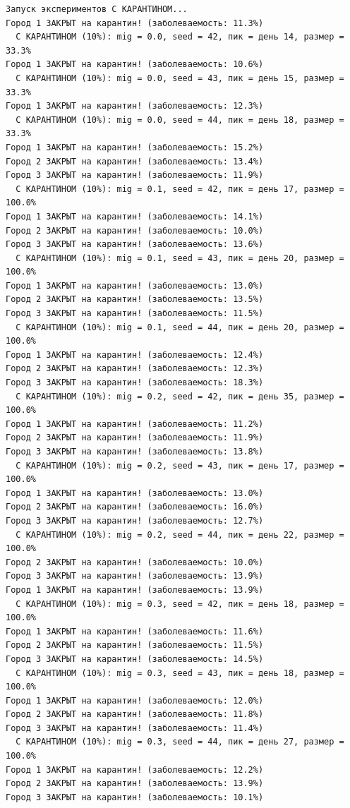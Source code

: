 \documentclass[
  12pt,
  a4paper,
  DIV=11,
  numbers=noendperiod]{scrreprt}
\begin{document}
\begin{verbatim}
Запуск экспериментов С КАРАНТИНОМ...
Город 1 ЗАКРЫТ на карантин! (заболеваемость: 11.3%)
  С КАРАНТИНОМ (10%): mig = 0.0, seed = 42, пик = день 14, размер = 33.3%
Город 1 ЗАКРЫТ на карантин! (заболеваемость: 10.6%)
  С КАРАНТИНОМ (10%): mig = 0.0, seed = 43, пик = день 15, размер = 33.3%
Город 1 ЗАКРЫТ на карантин! (заболеваемость: 12.3%)
  С КАРАНТИНОМ (10%): mig = 0.0, seed = 44, пик = день 18, размер = 33.3%
Город 1 ЗАКРЫТ на карантин! (заболеваемость: 15.2%)
Город 2 ЗАКРЫТ на карантин! (заболеваемость: 13.4%)
Город 3 ЗАКРЫТ на карантин! (заболеваемость: 11.9%)
  С КАРАНТИНОМ (10%): mig = 0.1, seed = 42, пик = день 17, размер = 100.0%
Город 1 ЗАКРЫТ на карантин! (заболеваемость: 14.1%)
Город 2 ЗАКРЫТ на карантин! (заболеваемость: 10.0%)
Город 3 ЗАКРЫТ на карантин! (заболеваемость: 13.6%)
  С КАРАНТИНОМ (10%): mig = 0.1, seed = 43, пик = день 20, размер = 100.0%
Город 1 ЗАКРЫТ на карантин! (заболеваемость: 13.0%)
Город 2 ЗАКРЫТ на карантин! (заболеваемость: 13.5%)
Город 3 ЗАКРЫТ на карантин! (заболеваемость: 11.5%)
  С КАРАНТИНОМ (10%): mig = 0.1, seed = 44, пик = день 20, размер = 100.0%
Город 1 ЗАКРЫТ на карантин! (заболеваемость: 12.4%)
Город 2 ЗАКРЫТ на карантин! (заболеваемость: 12.3%)
Город 3 ЗАКРЫТ на карантин! (заболеваемость: 18.3%)
  С КАРАНТИНОМ (10%): mig = 0.2, seed = 42, пик = день 35, размер = 100.0%
Город 1 ЗАКРЫТ на карантин! (заболеваемость: 11.2%)
Город 2 ЗАКРЫТ на карантин! (заболеваемость: 11.9%)
Город 3 ЗАКРЫТ на карантин! (заболеваемость: 13.8%)
  С КАРАНТИНОМ (10%): mig = 0.2, seed = 43, пик = день 17, размер = 100.0%
Город 1 ЗАКРЫТ на карантин! (заболеваемость: 13.0%)
Город 2 ЗАКРЫТ на карантин! (заболеваемость: 16.0%)
Город 3 ЗАКРЫТ на карантин! (заболеваемость: 12.7%)
  С КАРАНТИНОМ (10%): mig = 0.2, seed = 44, пик = день 22, размер = 100.0%
Город 2 ЗАКРЫТ на карантин! (заболеваемость: 10.0%)
Город 3 ЗАКРЫТ на карантин! (заболеваемость: 13.9%)
Город 1 ЗАКРЫТ на карантин! (заболеваемость: 13.9%)
  С КАРАНТИНОМ (10%): mig = 0.3, seed = 42, пик = день 18, размер = 100.0%
Город 1 ЗАКРЫТ на карантин! (заболеваемость: 11.6%)
Город 2 ЗАКРЫТ на карантин! (заболеваемость: 11.5%)
Город 3 ЗАКРЫТ на карантин! (заболеваемость: 14.5%)
  С КАРАНТИНОМ (10%): mig = 0.3, seed = 43, пик = день 18, размер = 100.0%
Город 1 ЗАКРЫТ на карантин! (заболеваемость: 12.0%)
Город 2 ЗАКРЫТ на карантин! (заболеваемость: 11.8%)
Город 3 ЗАКРЫТ на карантин! (заболеваемость: 11.4%)
  С КАРАНТИНОМ (10%): mig = 0.3, seed = 44, пик = день 27, размер = 100.0%
Город 1 ЗАКРЫТ на карантин! (заболеваемость: 12.2%)
Город 2 ЗАКРЫТ на карантин! (заболеваемость: 13.9%)
Город 3 ЗАКРЫТ на карантин! (заболеваемость: 10.1%)

\end{verbatim}
\end{document}
